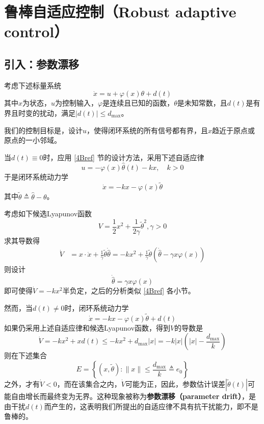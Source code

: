 \section{鲁棒自适应控制（Robust adaptive control）}\label{4Eref}
\subsection{引入：参数漂移}
考虑下述标量系统
\begin{equation}
    \dot{x} = u + \varphi(x)\theta + d(t)\label{Sys:with_disturbance}
\end{equation}
其中$x$为状态，$u$为控制输入，$\varphi$是连续且已知的函数，$\theta$是未知常数，且$d(t)$是有界且时变的扰动，满足$|d(t)|\le d_{\max}$。

我们的控制目标是，设计$u$，使得闭环系统的所有信号都有界，且$x$趋近于原点或原点的一小邻域。

当$d(t)\equiv 0$时，应用 \ref{4Bref} 节的设计方法，采用下述自适应律
\[ u=-\varphi(x)\hat{\theta}(t)-kx,\quad k>0\]
于是闭环系统动力学
\[\dot{x}=-kx-\varphi(x)\tilde{\theta}\]
其中$\tilde{\theta} \triangleq \hat{\theta}-\theta$。

考虑如下候选Lyapunov函数
\begin{equation}
    V=\frac12 x^2+\frac{1}{2\gamma}\tilde{\theta}^2,\gamma>0\label{robust_lya}
\end{equation}
求其导数得
\begin{align}
    \dot{V}&=x\cdot\dot{x}+\frac{1}{\gamma}\tilde{\theta}\dot{\hat{\theta}}
    =-kx^2+\frac{1}{\gamma}\tilde{\theta}(\dot{\hat{\theta}}-\gamma x\varphi(x))\label{robust_lya_dot}
\end{align}
则设计
\begin{equation}
    \dot{\hat{\theta}}=\gamma x\varphi(x)\label{adaptive_nodisturbance}
\end{equation}
即可使得$\dot{V}=-kx^2$半负定，之后的分析类似 \ref{4Bref} 各小节。

然而，当$d(t)\ne 0$时，闭环系统动力学
\[\dot{x}=-kx-\varphi(x)\tilde{\theta}+d(t)\]
如果仍采用上述自适应律和候选Lyapunov函数，得到$V$的导数是
\[\dot{V}=-kx^2+x d(t)\le -kx^2+d_{\max}|x|=-k|x|\left(|x|-\frac{d_{\max}}{k}\right)\]
则在下述集合
\begin{equation}
    E = \left\{(x,\tilde{\theta}): \| x \| \leq \frac{d_{\max}}{k} \triangleq e_{0}\right\}\label{dead-zone}
\end{equation}
之外，才有$\dot{V}<0$，而在该集合之内，$\dot{V}$可能为正，因此，参数估计误差$|\tilde{\theta}(t)|$可能自由增长而最终变为无界。这种现象被称为{\bf 参数漂移（parameter drift）}，是由干扰$d(t)$而产生的，这表明我们所提出的自适应律不具有抗干扰能力，即不是鲁棒的。

